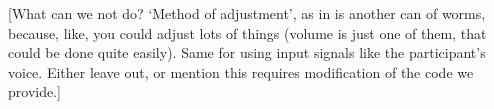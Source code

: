 \documentclass{sig-alternate}
\begin{document}
	[What can we not do? `Method of adjustment', as in \cite{schoeffler2015mushra} is another can of worms, because, like, you could adjust lots of things (volume is just one of them, that could be done quite easily). Same for using input signals like the participant's voice. Either leave out, or mention this requires modification of the code we provide.]

%

%
%
\end{document}
